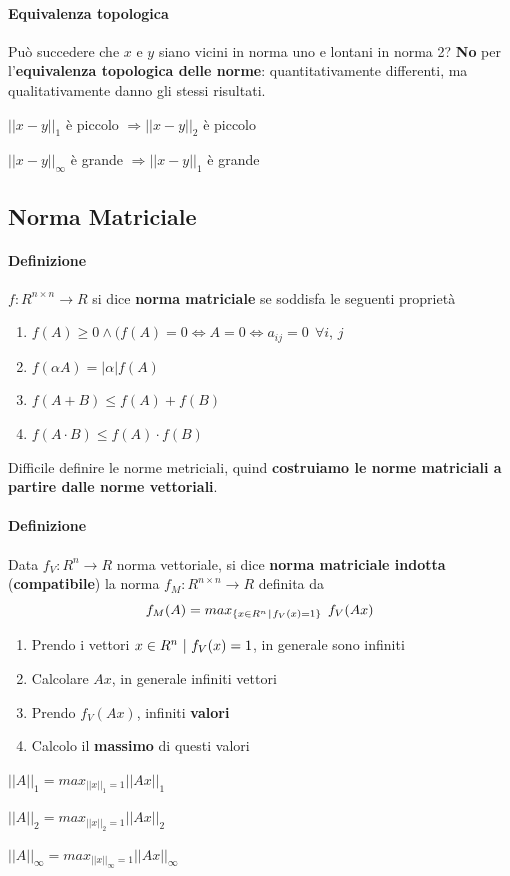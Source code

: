 \documentclass[10pt]{book}
\begin{document}
\paragraph{Equivalenza topologica} Può succedere che $x$ e $y$ siano vicini in norma uno e lontani in norma 2? \textbf{No} per l'\textbf{equivalenza topologica delle norme}: quantitativamente differenti, ma qualitativamente danno gli stessi risultati.
\begin{list}{}{}
	\item $||x - y||_1$ è piccolo $\Rightarrow ||x - y||_2$ è piccolo
	\item $||x - y||_\infty$ è grande $\Rightarrow ||x - y||_1$ è grande
\end{list}
\pagebreak
\subsection{Norma Matriciale}
\paragraph{Definizione} $f: R^{n \times n} \rightarrow R$ si dice \textbf{norma matriciale} se soddisfa le seguenti proprietà
\begin{enumerate}
	\item $f(A) \geq 0 \wedge (f(A) = 0 \Leftrightarrow A = 0 \Leftrightarrow a_{ij} = 0\:\:\forall i$, $j$
	\item $f(\alpha A) = |\alpha| f(A)$
	\item $f(A + B) \leq f(A) + f(B)$
	\item $f(A\cdot B) \leq f(A)\cdot f(B)$
\end{enumerate}
Difficile definire le norme metriciali, quind \textbf{costruiamo le norme matriciali a partire dalle norme vettoriali}.
\paragraph{Definizione} Data $f_V: R^n \rightarrow R$ norma vettoriale, si dice \textbf{norma matriciale indotta} (\textbf{compatibile}) la norma $f_M: R^{n \times n} \rightarrow R$ definita da
$$f_M(A) = max_{\{x \in R^n\:\vline\:f_V(x) = 1\}}\:\:f_V(Ax)$$
\begin{enumerate}
	\item Prendo i vettori $x \in R^n\:\:\vline\:\:f_V(x) = 1$, in generale sono infiniti
	\item Calcolare $Ax$, in generale infiniti vettori
	\item Prendo $f_V(Ax)$, infiniti \textbf{valori}
	\item Calcolo il \textbf{massimo} di questi valori
\end{enumerate}
\begin{list}{}{}
	\item $||A||_1 = max_{||x||_1 = 1} ||Ax||_1$
	\item $||A||_2 = max_{||x||_2 = 1} ||Ax||_2$
	\item $||A||_\infty = max_{||x||_\infty = 1} ||Ax||_\infty$
\end{list}
\end{document}
